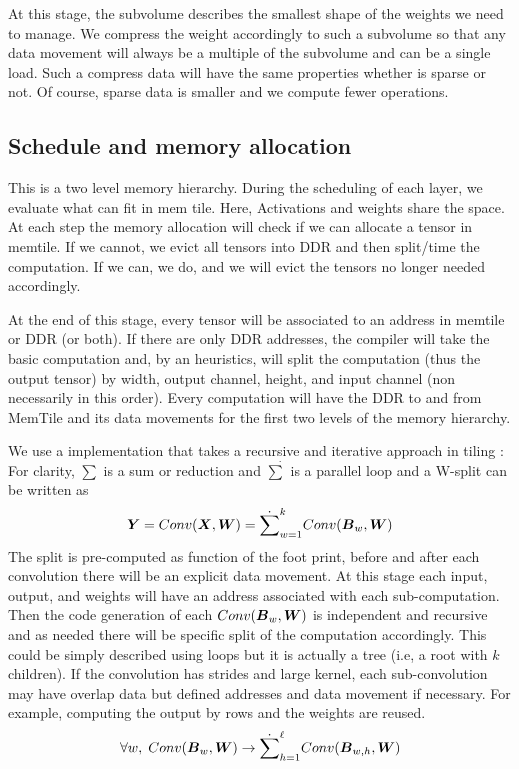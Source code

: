 \documentclass[conference]{IEEEtran}
\begin{document}
At this stage, the subvolume describes the smallest shape of the
weights we need to manage. We compress the weight accordingly to such
a subvolume so that any data movement will always be a multiple of the
subvolume and can be a single load. Such a compress data will have the
same properties whether is sparse or not. Of course, sparse data is
smaller and we compute fewer operations.


\subsection{Schedule and memory allocation}
This is a two level memory hierarchy. During the scheduling of each
layer, we evaluate what can fit in mem tile. Here, Activations and
weights share the space. At each step the memory allocation will check
if we can allocate a tensor in memtile. If we cannot, we evict all
tensors into DDR and then split/time the computation. If we can, we
do, and we will evict the tensors no longer needed accordingly.

At the end of this stage, every tensor will be associated to an
address in memtile or DDR (or both). If there are only DDR addresses,
the compiler will take the basic computation and, by an heuristics,
will split the computation (thus the output tensor) by width, output
channel, height, and input channel (non necessarily in this
order). Every computation will have the DDR to and from MemTile and
its data movements for the first two levels of the memory hierarchy.

We use a implementation that takes a recursive and iterative approach
in tiling \cite{abs-2110-04327}: For clarity, $\sum$ is a sum or
reduction and $\dot{\sum}$ is a parallel loop and a W-split can be
written as
\begin{equation}
  {\boldsymbol Y} =  Conv({\boldsymbol X},{\boldsymbol W}) = \dot{\sum}_{w=1}^k
  Conv({\boldsymbol B}_w,{\boldsymbol W})
\end{equation}
The split is pre-computed as function of the foot print, before and
after each convolution there will be an explicit data movement. At
this stage each input, output, and weights will have an address
associated with each sub-computation. Then the code generation of each
$Conv({\boldsymbol B}_w,{\boldsymbol W})$ is independent and recursive and as needed
there will be specific split of the computation accordingly. This
could be simply described using loops but it is actually a tree (i.e,
a root with $k$ children). If the convolution has strides and large
kernel, each sub-convolution may have overlap data but defined
addresses and data movement if necessary. For example, computing the
output by rows and the weights are reused.
\begin{equation}
  \forall w, \;   Conv({\boldsymbol B}_w,{\boldsymbol W}) \rightarrow  \dot{\sum}_{h=1}^\ell Conv({\boldsymbol B}_{w,h},{\boldsymbol W})
\end{equation}
\end{document}
